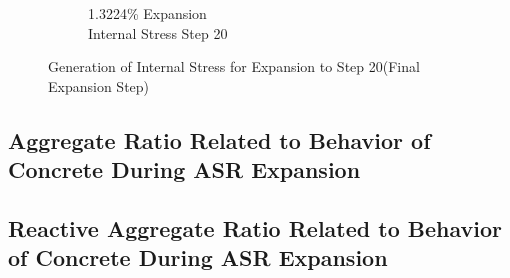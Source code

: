\begin{figure}[ht!]
\begin{subfigure}{.25\textwidth}
      \caption{1.3224\% Expansion\\Internal Stress Step 20}
    \end{subfigure}

\caption{Generation of Internal Stress for Expansion to Step 20(Final Expansion Step)}
\label{fig:A30_stress}
\end{figure}


\subsection{Aggregate Ratio Related to Behavior of Concrete During ASR Expansion}


\subsection{Reactive Aggregate Ratio Related to Behavior of Concrete During ASR Expansion}


